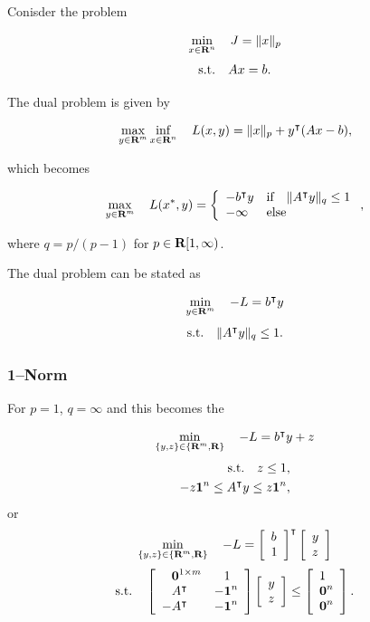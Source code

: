 \documentclass{article}
\begin{document}
\clearpage

Conisder the problem

\begin{align*}
    \min_{x\in\textbf{R}^n}\quad J = \|x\|_p
\end{align*}
\begin{align*}
    \text{s.t.}\quad Ax = b.
\end{align*}

The dual problem is given by

\begin{align*}
    \max_{y\in\textbf{R}^m}\inf_{x\in\textbf{R}^n}\quad L(x,y) = \|x\|_p + y^\intercal (Ax-b),
\end{align*}

which becomes
\cite[p.~221]{bv_cvxbook}\cite[p.~107]{luenberger}\cite[p.~123]{luenberger}

\begin{align*}
    \max_{y\in\textbf{R}^m}\quad L(x^*,y) = 
    \left\{ 
    \begin{array}{lllllllllllllllllll}
        -b^\intercal y & \text{if}\quad \|A^\intercal y\|_q\leq 1\\
        -\infty & \text{else}
    \end{array}    
    \right.,
\end{align*}

where $q=p/(p-1)$ for $p\in\textbf{R}[1,\infty)$.


The dual problem can be stated as

\begin{align*}
    \min_{y\in\textbf{R}^m}\quad -L = b^\intercal y
\end{align*}
\begin{align*}
    \text{s.t.}\quad \|A^\intercal y\|_q \leq 1.
\end{align*}

\subsubsection{1--Norm}

For $p=1$, $q=\infty$ and this becomes the \LP

\begin{align*}
    \min_{\{y,z\}\in\{\textbf{R}^m,\textbf{R}\}}\quad -L = b^\intercal y + z
\end{align*}
\begin{align*}
    \text{s.t.}\quad z \leq 1,\\
    -z\textbf{1}^n \leq A^\intercal y \leq z\textbf{1}^n,
\end{align*}
or
\begin{align*}
    \min_{\{y,z\}\in\{\textbf{R}^m,\textbf{R}\}}\quad -L =\left[\begin{array}{lllllllllllllllllll}b\\1\end{array}\right]^\intercal \left[\begin{array}{lllllllllllllllllll}y \\ z\end{array}\right]
\end{align*}
\begin{align*}
    \st\quad 
    \mat{\minus\zeros^{1\times m} & \minus1\\ \minus A^\tp & -\ones^n \\ -A^\tp & -\ones^n }\mat{y\\z}\leq\mat{1\\\zeros^n\\\zeros^n}.
\end{align*}
\end{document}
